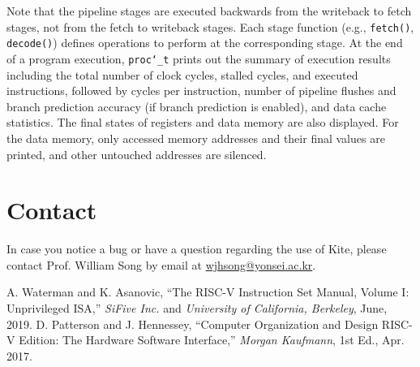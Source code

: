 \documentclass[10pt]{article}
\begin{document}
\begin{itemize}
    Note that the pipeline stages are executed backwards from the writeback to fetch stages, not from the fetch to writeback stages.
    Each stage function (e.g., {\tt fetch()}, {\tt decode()}) defines operations to perform at the corresponding stage.
    At the end of a program execution, {\tt proc\char`_t} prints out the summary of execution results including the total number of clock cycles, stalled cycles, and executed instructions, followed by cycles per instruction, number of pipeline flushes and branch prediction accuracy (if branch prediction is enabled), and data cache statistics.
    The final states of registers and data memory are also displayed.
    For the data memory, only accessed memory addresses and their final values are printed, and other untouched addresses are silenced.
\end{itemize}


\section{Contact} \label{sec:contact}
In case you notice a bug or have a question regarding the use of Kite, please contact Prof. William Song by email at \href{mailto:wjhsong@yonsei.ac.kr}{wjhsong@yonsei.ac.kr}.


\begin{thebibliography}{2}
    A. Waterman and K. Asanovic, 
    ``The RISC-V Instruction Set Manual, Volume I: Unprivileged ISA,''
    \emph{SiFive Inc.} and \emph{University of California, Berkeley},
    June, 2019.
    D. Patterson and J. Hennessey,
    ``Computer Organization and Design RISC-V Edition: The Hardware Software Interface,''
    \emph{Morgan Kaufmann}, 1st Ed.,
    Apr. 2017.
\end{thebibliography}
\end{document}
